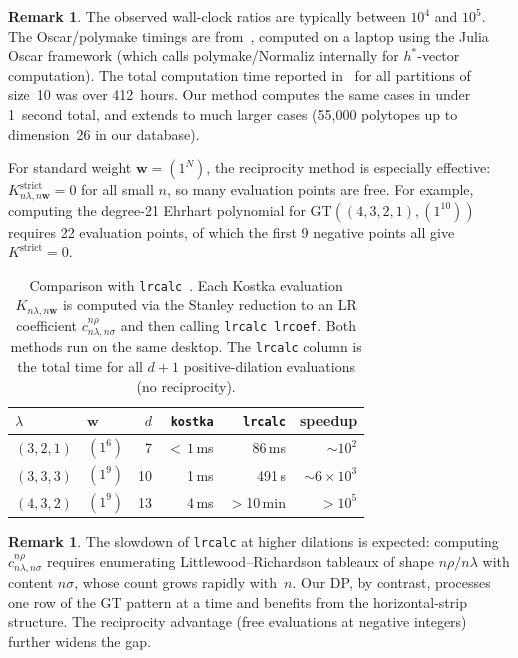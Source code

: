 \documentclass[11pt,reqno]{amsart}
\theoremstyle{definition}
\newtheorem{remark}[theorem]{Remark}
\newcommand{\GT}{\mathrm{GT}}
\newcommand{\lam}{\lambda}
\newcommand{\wt}{\mathbf{w}}
\begin{document}
\begin{remark}\label{rem:speedup}
The observed wall-clock ratios are typically between $10^4$ and $10^5$.
The Oscar/polymake timings are from~\cite{OskarThesis},
computed on a laptop using the Julia Oscar framework
(which calls polymake/Normaliz internally for $h^*$-vector computation).
The total computation time reported in~\cite{OskarThesis} for all
partitions of size~10 was over 412~hours.  Our method computes the same
cases in under 1~second total, and extends to much larger cases
(55{,}000 polytopes up to dimension~26 in our database).

For standard weight $\wt = (1^N)$, the reciprocity method is especially
effective: $K^{\mathrm{strict}}_{n\lam, n\wt} = 0$ for all small $n$,
so many evaluation points are free.  For example, computing the
degree-21 Ehrhart polynomial for $\GT((4,3,2,1), (1^{10}))$ requires
22 evaluation points, of which the first 9 negative points all give
$K^{\mathrm{strict}} = 0$.
\end{remark}

\begin{table}[!ht]
\centering
\caption{%
  Comparison with \texttt{lrcalc}~\cite{Buch2000}.
  Each Kostka evaluation $K_{n\lam, n\wt}$ is computed via the
  Stanley reduction to an LR coefficient $c^{n\rho}_{n\lam, n\sigma}$
  and then calling \texttt{lrcalc lrcoef}.  Both methods run on the
  same desktop.  The \texttt{lrcalc} column is the total time for
  all $d+1$ positive-dilation evaluations (no reciprocity).
}
\label{tab:lrcalc}
\begin{tabular*}{\textwidth}{@{\extracolsep{\fill}}llrrrr@{}}
\toprule
$\lam$ & $\wt$ & $d$ & \texttt{kostka} & \texttt{lrcalc} & speedup \\
\midrule
$(3,2,1)$   & $(1^6)$  &  7 & ${<}\,1$\,ms & 86\,ms    & $\sim\!10^2$ \\
$(3,3,3)$   & $(1^9)$  & 10 & 1\,ms         & 491\,s    & $\sim\!6 \times 10^3$ \\
$(4,3,2)$   & $(1^9)$  & 13 & 4\,ms         & $>\!$10\,min & $>\!10^5$ \\
\bottomrule
\end{tabular*}
\end{table}

\begin{remark}\label{rem:lrcalcSlowdown}
The slowdown of \texttt{lrcalc} at higher dilations is expected:
computing $c^{n\rho}_{n\lam, n\sigma}$ requires enumerating
Littlewood--Richardson tableaux of shape $n\rho / n\lam$ with
content $n\sigma$, whose count grows rapidly with~$n$.  Our DP, by
contrast, processes one row of the GT pattern at a time and benefits
from the horizontal-strip structure.  The reciprocity advantage
(free evaluations at negative integers) further widens the gap.
\end{remark}
\end{document}

